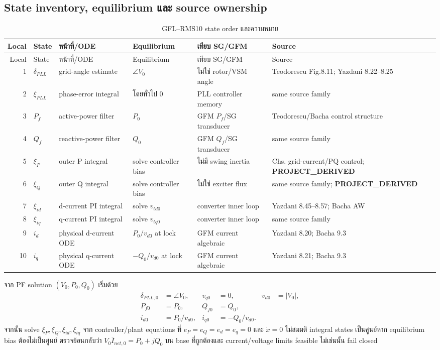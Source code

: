 \documentclass[12pt,a4paper]{article}
\newcommand{\derived}{\textcolor{teal!70!black}{\textbf{PROJECT\_DERIVED}}}
\begin{document}
\subsection{State inventory, equilibrium และ source ownership}

\small
\begin{longtable}{r p{} p{} p{} p{} p{}}
\caption{GFL--RMS10 state order และความหมาย}\label{tab:gfl10-states}\\
\toprule
Local & State & หน้าที่/ODE & Equilibrium & เทียบ SG/GFM & Source \\\midrule
\endfirsthead
\toprule Local & State & หน้าที่/ODE & Equilibrium & เทียบ SG/GFM & Source \\\midrule
\endhead
1 & $\delta_{PLL}$ & grid-angle estimate & $\angle V_0$ & ไม่ใช่ rotor/VSM angle & Teodorescu Fig.8.11; Yazdani 8.22--8.25 \\
2 & $\xi_{PLL}$ & phase-error integral & โดยทั่วไป $0$ & PLL controller memory & same source family \\
3 & $P_f$ & active-power filter & $P_0$ & GFM $P_f$/SG transducer & Teodorescu/Bacha control structure \\
4 & $Q_f$ & reactive-power filter & $Q_0$ & GFM $Q_f$/SG transducer & same source family \\
5 & $\xi_P$ & outer P integral & solve controller bias & ไม่มี swing inertia & Chs. grid-current/PQ control; \derived \\
6 & $\xi_Q$ & outer Q integral & solve controller bias & ไม่ใช่ exciter flux & same source family; \derived \\
7 & $\xi_{id}$ & d-current PI integral & solve $v_{td0}$ & converter inner loop & Yazdani 8.45--8.57; Bacha AW \\
8 & $\xi_{iq}$ & q-current PI integral & solve $v_{tq0}$ & converter inner loop & same source family \\
9 & $i_d$ & physical d-current ODE & $P_0/v_{d0}$ at lock & GFM current algebraic & Yazdani 8.20; Bacha 9.3 \\
10 & $i_q$ & physical q-current ODE & $-Q_0/v_{d0}$ at lock & GFM current algebraic & Yazdani 8.21; Bacha 9.3 \\
\bottomrule
\end{longtable}
\normalsize

จาก PF solution $(V_0,P_0,Q_0)$ เริ่มด้วย
\begin{align}
\delta_{PLL,0}&=\angle V_0,&v_{q0}&=0,&v_{d0}&=|V_0|,\\
P_{f0}&=P_0,&Q_{f0}&=Q_0,\\
i_{d0}&=P_0/v_{d0},&i_{q0}&=-Q_0/v_{d0}.
\label{eq:gfl10-init-a}
\end{align}
จากนั้น solve $\xi_P,\xi_Q,\xi_{id},\xi_{iq}$ จาก controller/plant equations
ที่ $e_P=e_Q=e_d=e_q=0$ และ $\dot x=0$ ไม่สมมติ integral states เป็นศูนย์หาก
equilibrium bias ต้องไม่เป็นศูนย์ ตรวจย้อนกลับว่า
$V_0\overline I_{net,0}=P_0+jQ_0$ บน base ที่ถูกต้องและ current/voltage limits feasible
ไม่เช่นนั้น fail closed
\end{document}
